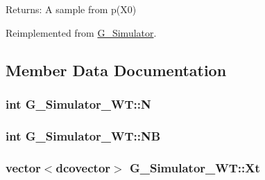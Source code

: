\begin{Desc}
\item[Returns:]A sample from p(X0) \end{Desc}


Reimplemented from \hyperlink{class_g___simulator_0e9a1d220c5457cc07c6bcdb70e1638c}{G\_\-Simulator}.

\subsection{Member Data Documentation}
\hypertarget{class_g___simulator___w_t_8036e2d318c76440f0ed2e23dd5f5523}{
\subsubsection[{N}]{\setlength{\rightskip}{0pt plus 5cm}int {\bf G\_\-Simulator\_\-WT::N}}}
\label{class_g___simulator___w_t_8036e2d318c76440f0ed2e23dd5f5523}


\hypertarget{class_g___simulator___w_t_646b6b5a2328052988746ea2e85ec2f5}{
\subsubsection[{NB}]{\setlength{\rightskip}{0pt plus 5cm}int {\bf G\_\-Simulator\_\-WT::NB}}}
\label{class_g___simulator___w_t_646b6b5a2328052988746ea2e85ec2f5}


\hypertarget{class_g___simulator___w_t_74786ef68257c2af89893c9c12a0e7f2}{
\subsubsection[{Xt}]{\setlength{\rightskip}{0pt plus 5cm}vector$<$dcovector$>$ {\bf G\_\-Simulator\_\-WT::Xt}}}
\label{class_g___simulator___w_t_74786ef68257c2af89893c9c12a0e7f2}


